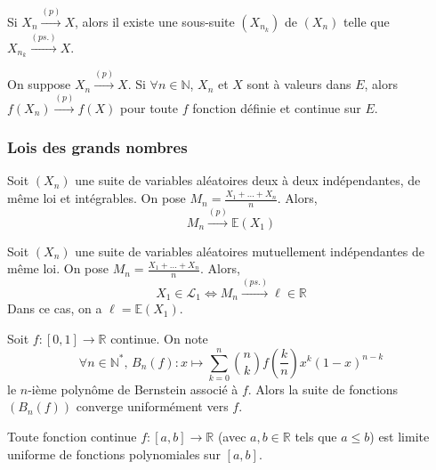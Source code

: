 
  \begin{theorem}
    Si $X_n \overset{(p)}{\longrightarrow} X$, alors il existe une sous-suite $(X_{n_k})$ de $(X_n)$ telle que $X_{n_k} \overset{(ps.)}{\longrightarrow} X$.
  \end{theorem}

  \begin{corollary}
    On suppose $X_n \overset{(p)}{\longrightarrow} X$. Si $\forall n \in \mathbb{N}$, $X_n$ et $X$ sont à valeurs dans $E$, alors $f(X_n) \overset{(p)}{\longrightarrow} f(X)$ pour toute $f$ fonction définie et continue sur $E$.
  \end{corollary}

  \subsubsection{Lois des grands nombres}


  \begin{theorem}
    Soit $(X_n)$ une suite de variables aléatoires deux à deux indépendantes, de même loi et intégrables. On pose $M_n = \frac{X_1 + \dots + X_n}{n}$. Alors,
    \[ M_n \overset{(p)}{\longrightarrow} \mathbb{E}(X_1) \]
  \end{theorem}


  \begin{theorem}
    Soit $(X_n)$ une suite de variables aléatoires mutuellement indépendantes de même loi. On pose $M_n = \frac{X_1 + \dots + X_n}{n}$. Alors,
    \[ X_1 \in \mathcal{L}_1 \iff M_n \overset{(ps.)}{\longrightarrow} \ell \in \mathbb{R} \]
    Dans ce cas, on a $\ell = \mathbb{E}(X_1)$.
  \end{theorem}


  \begin{application}
    Soit $f : [0,1] \rightarrow \mathbb{R}$ continue. On note
    \[ \forall n \in \mathbb{N}^*, \, B_n(f) : x \mapsto \sum_{k=0}^n \binom{n}{k} f \left( \frac{k}{n} \right) x^k (1-x)^{n-k} \]
    le $n$-ième polynôme de Bernstein associé à $f$. Alors la suite de fonctions $(B_n(f))$ converge uniformément vers $f$.
  \end{application}

  \begin{corollary}
    Toute fonction continue $f : [a,b] \rightarrow \mathbb{R}$ (avec $a, b \in \mathbb{R}$ tels que $a \leq b$) est limite uniforme de fonctions polynomiales sur $[a, b]$.
  \end{corollary}

